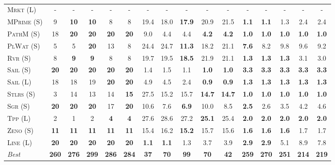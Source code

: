 \documentclass[11pt,landscape]{article}
\begin{document}
\begin{table*}[tb]
{\begin{tabular}{|l||ccccc||ccccc||ccccc||}
\textsc{Mrkt} (L)&-&-&-&-&-&-&-&-&-&-&-&-&-&-&-\\
\textsc{MPrime} (S)&9&\textbf{10}&\textbf{10}&8&8&19.4&18.0&\textbf{17.9}&20.9&21.5&\textbf{1.1}&\textbf{1.1}&1.3&2.4&2.4\\
\textsc{PathM} (S)&18&\textbf{20}&\textbf{20}&\textbf{20}&\textbf{20}&9.0&4.4&4.4&\textbf{4.2}&\textbf{4.2}&\textbf{1.0}&\textbf{1.0}&\textbf{1.0}&\textbf{1.0}&\textbf{1.0}\\
\textsc{PlWat} (S)&5&5&\textbf{20}&13&8&24.4&24.7&\textbf{11.3}&18.2&21.1&\textbf{7.6}&8.2&9.8&9.6&9.2\\
\textsc{Rvr} (S)&8&\textbf{9}&\textbf{9}&8&8&19.7&19.5&\textbf{18.5}&21.9&21.1&\textbf{1.3}&\textbf{1.3}&\textbf{1.3}&3.1&3.0\\
\textsc{Sail} (S)&\textbf{20}&\textbf{20}&\textbf{20}&\textbf{20}&\textbf{20}&1.4&1.5&1.1&\textbf{1.0}&\textbf{1.0}&\textbf{3.3}&\textbf{3.3}&\textbf{3.3}&\textbf{3.3}&\textbf{3.3}\\
\textsc{Sail} (L)&18&18&19&\textbf{20}&\textbf{20}&4.9&4.5&2.4&\textbf{0.9}&\textbf{0.9}&\textbf{1.3}&\textbf{1.3}&\textbf{1.3}&\textbf{1.3}&\textbf{1.3}\\
\textsc{Stlrs} (S)&3&14&13&14&\textbf{15}&27.5&15.2&15.7&\textbf{14.7}&\textbf{14.7}&\textbf{1.0}&\textbf{1.0}&\textbf{1.0}&\textbf{1.0}&\textbf{1.0}\\
\textsc{Sgr} (S)&\textbf{20}&\textbf{20}&\textbf{20}&17&\textbf{20}&10.6&7.6&\textbf{6.9}&10.0&8.5&\textbf{2.5}&2.6&3.5&4.2&4.6\\
\textsc{Tpp} (L)&2&1&2&\textbf{4}&\textbf{4}&27.6&28.6&27.2&\textbf{25.1}&25.4&\textbf{2.0}&\textbf{2.0}&\textbf{2.0}&\textbf{2.0}&\textbf{2.0}\\
\textsc{Zeno} (S)&\textbf{11}&\textbf{11}&\textbf{11}&\textbf{11}&\textbf{11}&15.4&16.2&\textbf{15.2}&15.7&15.6&\textbf{1.6}&\textbf{1.6}&\textbf{1.6}&1.7&1.7\\
\textsc{Line} (L)&\textbf{20}&\textbf{20}&\textbf{20}&\textbf{20}&\textbf{20}&\textbf{1.1}&\textbf{1.1}&1.3&3.7&3.9&\textbf{2.9}&\textbf{2.9}&5.1&8.9&7.8
\\\hline
\textit{Best}&\textbf{260}&\textbf{276}&\textbf{299}&\textbf{286}&\textbf{284}&\textbf{37}&\textbf{70}&\textbf{99}&\textbf{70}&\textbf{42}&\textbf{259}&\textbf{270}&\textbf{251}&\textbf{214}&\textbf{219}\\\hline

        \end{tabular}}
        \caption{}
        \label{tab:all-patty}
        \end{table*}
        
\end{document}
